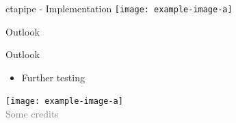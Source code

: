 \documentclass[aspectratio=1610, 9pt]{beamer}
\begin{document}
\begin{frame}{ctapipe - Implementation}
    \centering
    \texttt{[image: example-image-a]}\\
\end{frame}

\begin{frame}
  \begin{center}
    \fontsize{40}{48} \selectfont\textcolor{tugreen}{Outlook}
  \end{center}
\end{frame}

\begin{frame}{Outlook}
    \begin{minipage}{0.49\textwidth}
        \begin{itemize}
            \item Further testing
        \end{itemize}
    \end{minipage}
    \hfill
    \begin{minipage}{0.5\textwidth}
        \centering
        \texttt{[image: example-image-a]}\\
        \tiny{{\textcolor{gray}{Some credits}}}
    \end{minipage}
\end{frame}
\end{document}
